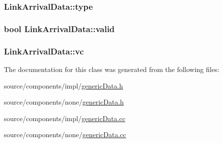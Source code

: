 \hypertarget{classLinkArrivalData_67623829975f533c48e4b6552eed2780}{
\subsubsection[{type}]{ {\bf LinkArrivalData::type}}}
\label{classLinkArrivalData_67623829975f533c48e4b6552eed2780}


\hypertarget{classLinkArrivalData_2f9a1f28c8833db08318a1e2b018c9f8}{
\subsubsection[{valid}]{\setlength{\rightskip}{0pt plus 5cm}bool {\bf LinkArrivalData::valid}}}
\label{classLinkArrivalData_2f9a1f28c8833db08318a1e2b018c9f8}


\hypertarget{classLinkArrivalData_0015d63ec0989b053ebd3236688d9e9a}{
\subsubsection[{vc}]{ {\bf LinkArrivalData::vc}}}
\label{classLinkArrivalData_0015d63ec0989b053ebd3236688d9e9a}




The documentation for this class was generated from the following files:\begin{CompactItemize}
\item 
source/components/impl/\hyperlink{impl_2genericData_8h}{genericData.h}\item 
source/components/none/\hyperlink{none_2genericData_8h}{genericData.h}\item 
source/components/impl/\hyperlink{impl_2genericData_8cc}{genericData.cc}\item 
source/components/none/\hyperlink{none_2genericData_8cc}{genericData.cc}\end{CompactItemize}
